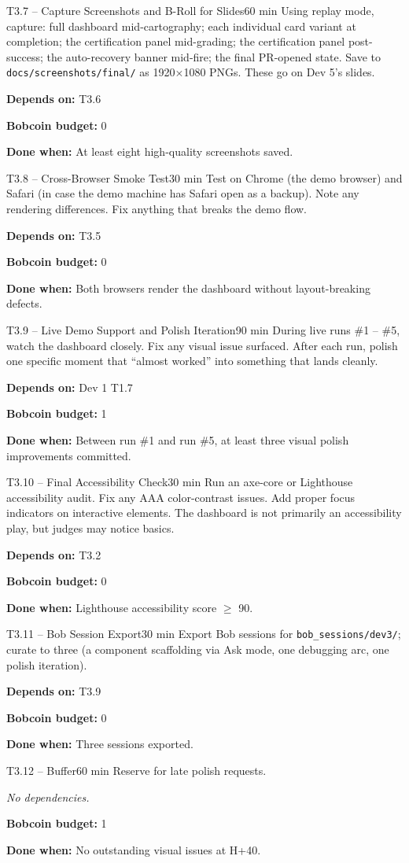 \documentclass[11pt,letterpaper]{article}
\newcommand{\acceptance}[1]{\par\smallskip\textcolor{ibmgreen}{\textbf{Done when:}} #1}
\newcommand{\depends}[1]{\par\smallskip\textcolor{ibmorange}{\textbf{Depends on:}} #1}
\newcommand{\nodep}{\par\smallskip\textcolor{ibmgray}{\textit{No dependencies.}}}
\newcommand{\bobcost}[1]{\par\smallskip\textcolor{ibmaccent}{\textbf{Bobcoin budget:}} #1}
\begin{document}
\begin{task}{T3.7 -- Capture Screenshots and B-Roll for Slides}{60 min}
Using replay mode, capture: full dashboard mid-cartography; each individual card variant at completion; the certification panel mid-grading; the certification panel post-success; the auto-recovery banner mid-fire; the final PR-opened state. Save to \texttt{docs/screenshots/final/} as 1920$\times$1080 PNGs. These go on Dev 5's slides.
\depends{T3.6}
\bobcost{0}
\acceptance{At least eight high-quality screenshots saved.}
\end{task}

\begin{task}{T3.8 -- Cross-Browser Smoke Test}{30 min}
Test on Chrome (the demo browser) and Safari (in case the demo machine has Safari open as a backup). Note any rendering differences. Fix anything that breaks the demo flow.
\depends{T3.5}
\bobcost{0}
\acceptance{Both browsers render the dashboard without layout-breaking defects.}
\end{task}

\begin{task}{T3.9 -- Live Demo Support and Polish Iteration}{90 min}
During live runs \#1 -- \#5, watch the dashboard closely. Fix any visual issue surfaced. After each run, polish one specific moment that ``almost worked'' into something that lands cleanly.
\depends{Dev 1 T1.7}
\bobcost{1}
\acceptance{Between run \#1 and run \#5, at least three visual polish improvements committed.}
\end{task}

\begin{task}{T3.10 -- Final Accessibility Check}{30 min}
Run an axe-core or Lighthouse accessibility audit. Fix any AAA color-contrast issues. Add proper focus indicators on interactive elements. The dashboard is not primarily an accessibility play, but judges may notice basics.
\depends{T3.2}
\bobcost{0}
\acceptance{Lighthouse accessibility score $\geq$ 90.}
\end{task}

\begin{task}{T3.11 -- Bob Session Export}{30 min}
Export Bob sessions for \texttt{bob\_sessions/dev3/}; curate to three (a component scaffolding via Ask mode, one debugging arc, one polish iteration).
\depends{T3.9}
\bobcost{0}
\acceptance{Three sessions exported.}
\end{task}

\begin{task}{T3.12 -- Buffer}{60 min}
Reserve for late polish requests.
\nodep
\bobcost{1}
\acceptance{No outstanding visual issues at H+40.}
\end{task}
\end{document}

